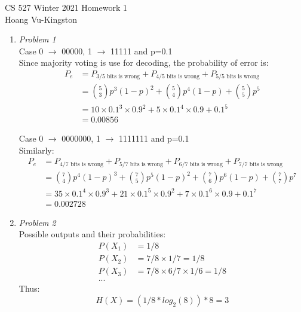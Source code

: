 \documentclass[12pt]{article}
\begin{document}
CS 527 Winter 2021 \hfill Homework 1\\
Hoang Vu-Kingston

\hrulefill

\begin{enumerate}

	\item\textit{Problem 1}\\
    Case 0 $\rightarrow$ 00000, 1 $\rightarrow$ 11111 and p=0.1\\
    Since majority voting is use for decoding, the probability of error is:
    \begin{align*}
        P_e  &= P_{\text{3/5 bits is wrong}} + P_{\text{4/5 bits is wrong}} + P_{\text{5/5 bits is wrong}} \\
        &= {5 \choose 3}p^3(1-p)^2 + {5 \choose 4}p^4(1-p) + {5 \choose 5}p^5\\
        &= 10 \times 0.1^3 \times 0.9^2 + 5 \times 0.1^4 \times 0.9 + 0.1^5\\
        &= 0.00856
    \end{align*}

    Case 0 $\rightarrow$ 0000000, 1 $\rightarrow$ 1111111 and p=0.1\\
    Similarly:
    \begin{align*}
        P_e  &= P_{\text{4/7 bits is wrong}} + P_{\text{5/7 bits is wrong}} + P_{\text{6/7 bits is wrong}} + P_{\text{7/7 bits is wrong}}\\
        &= {7 \choose 4}p^4(1-p)^3 + {7 \choose 5}p^5(1-p)^2 + {7 \choose 6}p^6(1-p) + {7 \choose 7}p^7\\
        &= 35 \times 0.1^4 \times 0.9^3 + 21 \times 0.1^5 \times 0.9^2 + 7 \times 0.1^6 \times 0.9 + 0.1^7\\
        &= 0.002728
    \end{align*}

    \item\textit{Problem 2}\\
    Possible outputs and their probabilities:
    \begin{align*}
        P(X_1) &= 1/8\\
        P(X_2) & = 7/8 \times 1/7 = 1/8\\
        P(X_3) & = 7/8 \times 6/7 \times 1/6= 1/8\\
        ...
    \end{align*}
    Thus:
    \begin{equation*}
        H(X) = (1/8*log_2(8))*8 = 3
    \end{equation*}


\end{enumerate}
\end{document}
